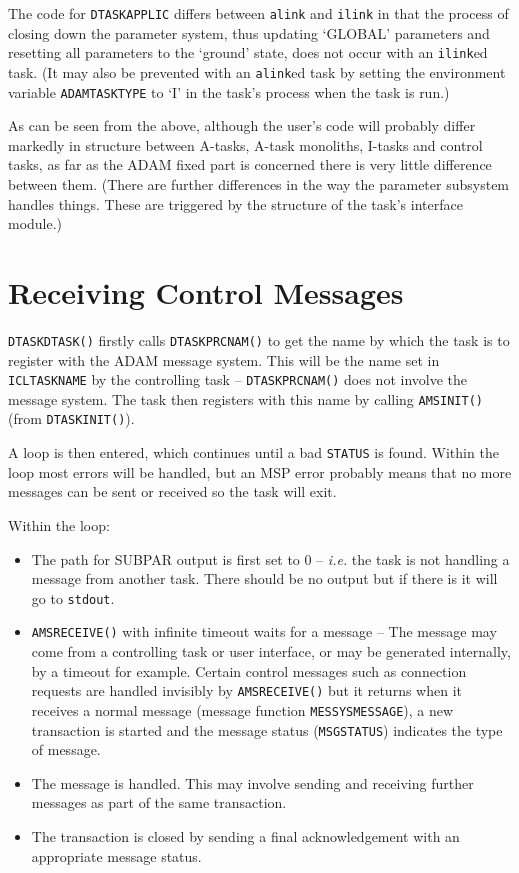 \documentclass[twoside,11pt]{article}
\newcommand{\xref}[3]{#1}
\renewcommand{\_}{\texttt{\symbol{95}}}
\begin{document}
The code for \texttt{DTASK\_APPLIC} differs between \texttt{alink} and
\texttt{ilink} in that the process of closing down the parameter system, thus
updating `GLOBAL' parameters and resetting all parameters to the `ground'
state, does not occur with an \texttt{ilink}ed task.
(It may also be prevented with an \texttt{alink}ed task by setting the
environment variable \texttt{ADAM\_TASK\_TYPE} to `I' in the task's process
when the task is run.)

As can be seen from the above, although the user's code will probably differ
markedly in structure between A-tasks, A-task monoliths, I-tasks and control
tasks, as far as the ADAM fixed part is concerned there is very little
difference between them.
(There are further differences in the way the parameter subsystem handles
things. These are triggered by the structure of the task's
\xref{interface module}{sun115}{abstract}.)

\section{\label{receiving_control_messages}Receiving Control Messages}
\texttt{DTASK\_DTASK()} firstly calls \texttt{DTASK\_PRCNAM()} to get the name
by which the task is to register with the ADAM message system.
This will be the name set in
\texttt{ICL\_TASK\_NAME} by the controlling task -- \texttt{DTASK\_PRCNAM()}
does not involve the message system.
The task then registers with this name by calling \texttt{AMS\_INIT()}
(from \texttt{DTASK\_INIT()}).

A loop is then entered, which continues until a bad \texttt{STATUS} is found.
Within the loop most errors will be handled, but an MSP error probably means
that no more messages can be sent or received so the task will exit.

Within the loop:
\begin{itemize}
\item The path for SUBPAR output is first set to 0 -- \textit{i.e.} the task
is not handling a message from another task.
There should be no output but if there is it will go to \texttt{stdout}.
\item \texttt{AMS\_RECEIVE()} with infinite timeout waits for a message --
The message may come from a controlling task or user interface, or may be
generated internally, by a timeout for example.
Certain control messages such as connection requests are handled invisibly
by \texttt{AMS\_RECEIVE()} but it returns when it receives a normal message
(message function \texttt{MESSYS\_\_MESSAGE}), a new transaction is started
and the message status (\texttt{MSGSTATUS}) indicates the type of message.
\item The message is handled. This may involve sending and receiving further
messages as part of the same transaction.
\item The transaction is closed by sending a final acknowledgement with an
appropriate message status.
\end{itemize}
\end{document}
